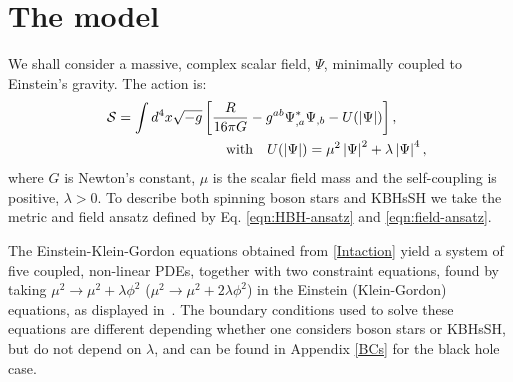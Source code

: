  
\section{The model}
\label{SIsec_model}
 
We shall consider a massive, complex scalar field, $\Psi$, minimally coupled to Einstein's gravity. The action is:
%
\begin{eqnarray}
  \label{Intaction}
  &&
	\mathcal{S} = \int d^4x \sqrt{-g}\left[\frac{R}{16\pi G}- g^{ab}\Psi^*_{,a}\Psi_{,b} - U(|\Psi|)\right],~~{~~} \ \  
\\
\label{pot}
&&~~~~{\rm with}~~~U(|\Psi|)= \mu^2\left|\Psi\right|^2 + \lambda\left|\Psi\right|^4,
\end{eqnarray}  
where $G$ is Newton's constant, $\mu$ is the scalar field mass and the self-coupling is positive, $ \lambda>0$. 
%
To describe both spinning boson stars and KBHsSH we take the metric and field ansatz defined by Eq. \eqref{eqn:HBH-ansatz} and \eqref{eqn:field-ansatz}.

The Einstein-Klein-Gordon equations obtained from \eqref{Intaction} yield a system of five coupled, non-linear PDEs, together with two constraint equations, found 
by taking $\mu^2\to \mu^2+ \lambda \phi^2$ ($\mu^2\to \mu^2+2\lambda \phi^2$) in the Einstein (Klein-Gordon) equations, as displayed in~\cite{Herdeiro:2015gia}.
The boundary conditions used to solve these
equations are different depending whether one considers boson stars or KBHsSH, but do not depend on $\lambda$, and can be found in Appendix \ref{BCs} for the black hole case.


